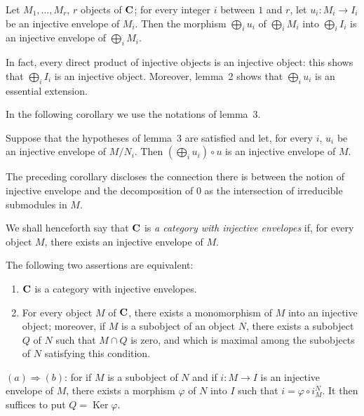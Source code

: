 \begin{proposition}
Let $M_1,\ldots,M_r$, $r$ objects of $\mathbf{C}$; for every integer $i$
between $1$ and $r$, let $u_i\colon M_i\to I_i$ be an injective
envelope of $M_i$. Then the morphism $\bigoplus_i u_i$ of
$\bigoplus_i M_i$ into $\bigoplus_i I_i$ is an injective envelope of
$\bigoplus_i M_i$.
\end{proposition}

In fact, every direct product of injective objects is an injective
object: this shows that $\bigoplus_i I_i$ is an injective object.
Moreover, lemma~2 shows that $\bigoplus_i u_i$ is an essential
extension.

In the following corollary we use the notations of lemma~3.

\begin{unnumberedcorollary}
Suppose that the hypotheses of lemma~3 are satisfied and let, for
every $i$, $u_i$ be an injective envelope of $M/N_i$. Then
$(\bigoplus_i u_i)\circ u$ is an injective envelope of $M$.
\end{unnumberedcorollary}

The preceding corollary discloses the connection there is between the
notion of injective envelope and the decomposition of $0$ as the
intersection of irreducible submodules in $M$.

We shall henceforth say that $\mathbf{C}$ is \emph{a category with injective
envelopes} if, for every object $M$, there exists an injective envelope
of $M$.

\begin{proposition}
The following two assertions are equivalent:
\begin{enumerate}
\item[a.] $\mathbf{C}$ is a category with injective envelopes.
\item[b.] For every object $M$ of $\mathbf{C}$, there exists a monomorphism
      of $M$ into an injective object; moreover, if $M$ is a subobject
      of an object $N$, there exists a subobject $Q$ of $N$ such that
      $M\cap Q$ is zero, and which is maximal among the subobjects of
      $N$ satisfying this condition.
\end{enumerate}
\end{proposition}

$(a)\Rightarrow(b)$: for if $M$ is a subobject of $N$ and if
$i\colon M\to I$ is an injective envelope of $M$, there exists a
morphism $\varphi$ of $N$ into $I$ such that $i = \varphi\circ i_M^N$.
It then suffices to put $Q = \operatorname{Ker}\varphi$.

